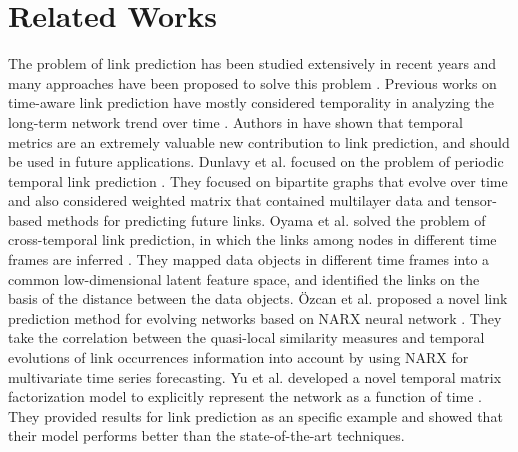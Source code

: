 \section{Related Works}\label{sec:related}

The problem of link prediction has been studied extensively in recent years and many approaches have been proposed to solve this problem \cite{wang2015link,wang2014review}.
Previous works on time-aware link prediction have mostly considered temporality in analyzing the long-term network trend over time \cite{dhote2013survey}. Authors in \cite{potgieter2009temporality} have shown that temporal metrics are an extremely valuable new contribution to link prediction, and should be used in future applications. 
Dunlavy et al. focused on the problem of periodic temporal link prediction \cite{dunlavy2011temporal}. They focused on bipartite graphs that evolve over time and also considered weighted matrix that contained multilayer data and tensor-based methods for predicting future links.
Oyama et al. solved the problem of cross-temporal link prediction, in which the links among nodes in different time frames are inferred \cite{oyama2011cross}. They mapped data objects in different time frames into a common low-dimensional latent feature space, and identified the links on the basis of the distance between the data objects.
{\"O}zcan et al. proposed a novel link prediction method for evolving networks based on NARX neural network \cite{ozcan2016temporal}. They take the correlation between the quasi-local similarity measures and temporal evolutions of link occurrences information into account by using NARX for multivariate time series forecasting.
Yu et al. developed a novel temporal matrix factorization model to explicitly represent the network as a function of time \cite{yu2017temporally}. They provided results for link prediction as an specific example and showed that their model performs better than the state-of-the-art techniques.

